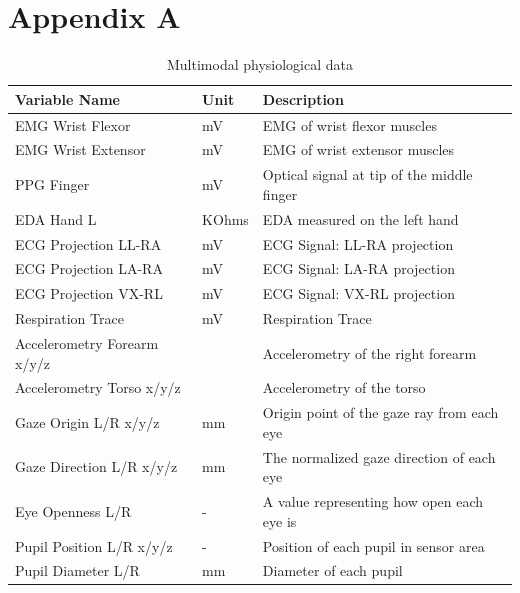 \documentclass[11pt, a4paper]{article}
\begin{document}


\clearpage
\appendix
{}
\section*{Appendix A} 
\label{app:a}

\begin{table}[htbp]
	\caption{Multimodal physiological data}
	\label{tab:physio}
	\centering
	\small
	\begin{tabular}{lll}
		\toprule                                 	
		Variable Name                   &  Unit        		&  Description     \\ 
		\midrule
		EMG Wrist Flexor  				& mV         	& EMG of wrist flexor muscles\\
		\midrule
		EMG Wrist Extensor				& mV          & EMG of wrist extensor muscles  \\
		\midrule  			
		PPG Finger   				& mV    & Optical signal at tip of the middle finger \\
		\midrule
		EDA Hand L    				& KOhms          		& EDA measured on the left hand \\
		\midrule
		ECG Projection LL-RA     & mV          		& ECG Signal: LL-RA projection \\
		\midrule
		ECG Projection LA-RA     & mV          		& ECG Signal: LA-RA projection \\
		\midrule
		ECG Projection VX-RL     & mV          		& ECG Signal: VX-RL projection \\
		\midrule
		Respiration Trace     	& mV          		& Respiration Trace \\
		\midrule
		Accelerometry Forearm x/y/z    & \text{m/s\textsuperscript{2}}  & Accelerometry of the right forearm\\
		\midrule
		Accelerometry Torso x/y/z    & \text{m/s\textsuperscript{2}}  & Accelerometry of the torso\\
		\midrule
		Gaze Origin L/R x/y/z		& mm		& Origin point of the gaze ray from each eye \\
		\midrule
		Gaze Direction L/R x/y/z	& mm		& The normalized gaze direction of each eye \\
		\midrule
		Eye Openness L/R  			& - 		& A value representing how open each eye is\\
		\midrule
		Pupil Position L/R x/y/z	& -			& Position of each pupil in sensor area\\
		\midrule
		Pupil Diameter L/R 			& mm		& Diameter of each pupil\\
		\bottomrule	
	\end{tabular}
\end{table}
\end{document}
